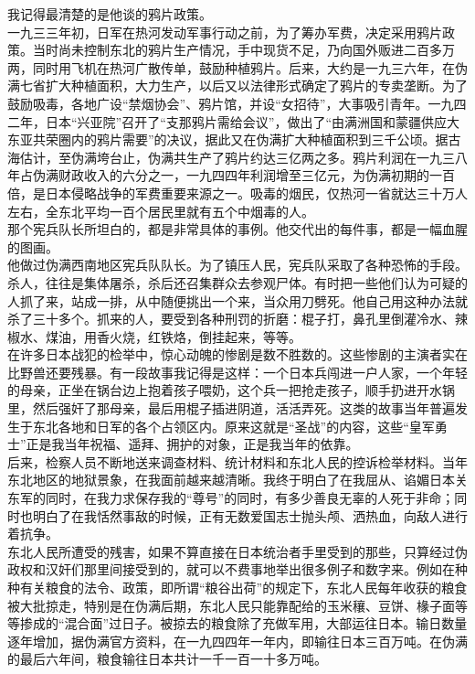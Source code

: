 我记得最清楚的是他谈的鸦片政策。\\

一九三三年初，日军在热河发动军事行动之前，为了筹办军费，决定采用鸦片政策。当时尚未控制东北的鸦片生产情况，手中现货不足，乃向国外贩进二百多万两，同时用飞机在热河广散传单，鼓励种植鸦片。后来，大约是一九三六年，在伪满七省扩大种植面积，大力生产，以后又以法律形式确定了鸦片的专卖垄断。为了鼓励吸毒，各地广设“禁烟协会”、鸦片馆，并设“女招待”，大事吸引青年。一九四二年，日本“兴亚院”召开了“支那鸦片需给会议”，做出了“由满洲国和蒙疆供应大东亚共荣圈内的鸦片需要”的决议，据此又在伪满扩大种植面积到三千公顷。据古海估计，至伪满垮台止，伪满共生产了鸦片约达三亿两之多。鸦片利润在一九三八年占伪满财政收入的六分之一，一九四四年利润增至三亿元，为伪满初期的一百倍，是日本侵略战争的军费重要来源之一。吸毒的烟民，仅热河一省就达三十万人左右，全东北平均一百个居民里就有五个中烟毒的人。\\

那个宪兵队长所坦白的，都是非常具体的事例。他交代出的每件事，都是一幅血腥的图画。\\

他做过伪满西南地区宪兵队队长。为了镇压人民，宪兵队采取了各种恐怖的手段。杀人，往往是集体屠杀，杀后还召集群众去参观尸体。有时把一些他们认为可疑的人抓了来，站成一排，从中随便挑出一个来，当众用刀劈死。他自己用这种办法就杀了三十多个。抓来的人，要受到各种刑罚的折磨：棍子打，鼻孔里倒灌冷水、辣椒水、煤油，用香火烧，红铁烙，倒挂起来，等等。\\

在许多日本战犯的检举中，惊心动魄的惨剧是数不胜数的。这些惨剧的主演者实在比野兽还要残暴。有一段故事我记得是这样：一个日本兵闯进一户人家，一个年轻的母亲，正坐在锅台边上抱着孩子喂奶，这个兵一把抢走孩子，顺手扔进开水锅里，然后强奸了那母亲，最后用棍子插进阴道，活活弄死。这类的故事当年普遍发生于东北各地和日军的各个占领区内。原来这就是“圣战”的内容，这些“皇军勇士”正是我当年祝福、遥拜、拥护的对象，正是我当年的依靠。\\

后来，检察人员不断地送来调查材料、统计材料和东北人民的控诉检举材料。当年东北地区的地狱景象，在我面前越来越清晰。我终于明白了在我屈从、谄媚日本关东军的同时，在我力求保存我的“尊号”的同时，有多少善良无辜的人死于非命；同时也明白了在我恬然事敌的时候，正有无数爱国志士抛头颅、洒热血，向敌人进行着抗争。\\

东北人民所遭受的残害，如果不算直接在日本统治者手里受到的那些，只算经过伪政权和汉奸们那里间接受到的，就可以不费事地举出很多例子和数字来。例如在种种有关粮食的法令、政策，即所谓“粮谷出荷”的规定下，东北人民每年收获的粮食被大批掠走，特别是在伪满后期，东北人民只能靠配给的玉米穰、豆饼、椽子面等等掺成的“混合面”过日子。被掠去的粮食除了充做军用，大部运往日本。输日数量逐年增加，据伪满官方资料，在一九四四年一年内，即输往日本三百万吨。在伪满的最后六年间，粮食输往日本共计一千一百一十多万吨。\\

